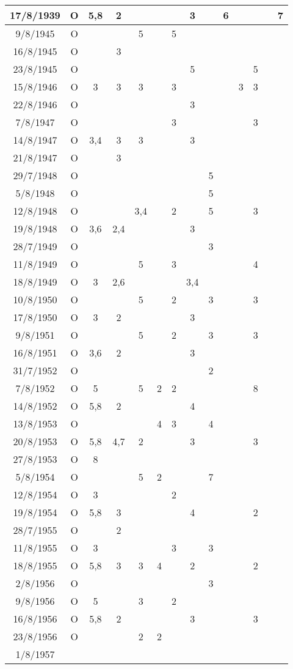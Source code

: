 \begin{longtable}{|c|c|c|c|c|c|c|c|c|c|c|c|c|c|}
\hline
	17/8/1939	 &
	O &
	5,8 & 2 & & & & 3 & & 6 & & & & 7
	\tabularnewline
\hline
	9/8/1945	&
	O &
	& & 5 & & 5 & & & & & & &
	\tabularnewline
\hline
	16/8/1945	 &
	O &
	& 3 & & & & & & & & & &
	\tabularnewline
\hline
	23/8/1945 &
	O &
	& & & & & 5 & & & & 5 & &
	\tabularnewline
\hline
	15/8/1946	 &
	O &
	3 & 3 & 3 & & 3 & & & & 3 & 3 & &
	\tabularnewline
\hline
	22/8/1946	 &
	O &
	& & & & & 3 & & & & & &
	\tabularnewline
\hline
	7/8/1947	&
	O &
	& & & & 3 & & & & & 3 & &
	\tabularnewline
\hline
	14/8/1947	 &
	O &
	3,4 & 3 & 3 & & & 3 & & & & & &
	\tabularnewline
\hline
	21/8/1947	 &
	O &
	& 3 & & & & & & & & & &
	\tabularnewline
\hline
	29/7/1948 &
	O &
	& & & & & & 5 & & & & &
	\tabularnewline
\hline
	5/8/1948	&
	O &
	& & & & & & 5 & & & & &
	\tabularnewline
\hline
	12/8/1948	 &
	O &
	& & 3,4 & & 2 & & 5 & & & 3 & &
	\tabularnewline
\hline
	19/8/1948	 &
	O &
	3,6 & 2,4 & & & & 3 & & & & & &
	\tabularnewline
\hline
	28/7/1949	 &
	O &
	& & & & & & 3 & & & & &
	\tabularnewline
\hline
	11/8/1949	 &
	O &
	& & 5 & & 3 & & & & & 4 & &
	\tabularnewline
\hline
	18/8/1949	 &
	O &
	3 & 2,6 & & & & 3,4 & & & & & &
	\tabularnewline
\hline
	10/8/1950	 &
	O &
	& & 5 & & 2 & & 3 & & & 3 & &
	\tabularnewline
\hline
	17/8/1950	 &
	O &
	3 & 2 & & & & 3 & & & & & &
	\tabularnewline
\hline
	9/8/1951	&
	O &
	& & 5 & & 2 & & 3 & & & 3 & &
	\tabularnewline
\hline
	16/8/1951	&
	O &
	3,6 & 2 & & & & 3 & & & & & &
	\tabularnewline
\hline
	31/7/1952 &
	O &
	& & & & & & 2 & & & & &
	\tabularnewline
\hline
	7/8/1952	&
	O &
	5 & & 5 & 2 & 2 & & & & & 8 & &
	\tabularnewline
\hline
	14/8/1952	 &
	O &
	5,8 & 2 & & & & 4 & & & & & &
	\tabularnewline
\hline
	13/8/1953	 &
	O &
	& & & 4 & 3 & & 4 & & & & &
	\tabularnewline
\hline
	20/8/1953	 &
	O &
	5,8 & 4,7 & 2 & & & 3 & & & & 3 & &
	\tabularnewline
\hline
	27/8/1953	 &
	O &
	8 & & & & & & & & & & &
	\tabularnewline
\hline
	5/8/1954	&
	O &
	& & 5 & 2 & & & 7 & & & & &
	\tabularnewline
\hline
	12/8/1954	 &
	O &
	3 & & & & 2 & & & & & & &
	\tabularnewline
\hline
	19/8/1954 &
	O &
	5,8 & 3 & & & & 4 & & & & 2 & &
	\tabularnewline
\hline
	28/7/1955	 &
	O &
	& 2 & & & & & & & & & &
	\tabularnewline
\hline
	11/8/1955	 &
	O &
	3 & & & & 3 & & 3 & & & & &
	\tabularnewline
\hline
	18/8/1955	 &
	O &
	5,8 & 3 & 3 & 4 & & 2 & & & & 2 & &
	\tabularnewline
\hline
	2/8/1956	&
	O &
	& & & & & & 3 & & & & &
	\tabularnewline
\hline
	9/8/1956	&
	O &
	5 & & 3 & & 2 & & & & & & &
	\tabularnewline
\hline
	16/8/1956	 &
	O &
	5,8 & 2 & & & & 3 & & & & 3 & &
	\tabularnewline
\hline
	23/8/1956	 &
	O &
	& & 2 & 2 & & & & & & & &
	\tabularnewline
\hline
	1/8/1957	&

\end{longtable}
